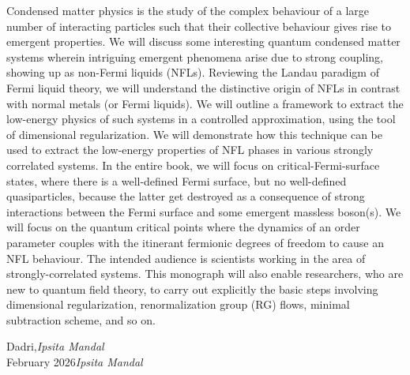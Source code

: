 %
%

\preface


Condensed matter physics is the study of the complex behaviour of a large number of interacting particles such that their collective behaviour gives rise to emergent properties. We will discuss some interesting quantum condensed matter systems wherein intriguing emergent phenomena arise due to strong coupling, showing up as non-Fermi liquids (NFLs). Reviewing the Landau paradigm of Fermi liquid theory, we will understand the distinctive origin of NFLs in contrast with  normal metals (or Fermi liquids). We will outline a framework to extract the low-energy physics of such systems in a controlled approximation, using the tool of dimensional regularization. We will demonstrate how this technique can be used to extract the low-energy properties of NFL phases in various strongly correlated systems. In the entire book, we will focus on critical-Fermi-surface states, where there is a well-defined Fermi surface, but no well-defined quasiparticles, because the latter get destroyed as a consequence of strong interactions between the Fermi surface and some emergent massless boson(s). We will focus on the quantum critical points where the dynamics of an order parameter couples with the itinerant fermionic degrees of freedom to cause an NFL behaviour. The intended audience is scientists working in the area of strongly-correlated systems. This monograph will also enable researchers, who are new to quantum field theory, to carry out explicitly the basic steps involving dimensional regularization, renormalization group (RG) flows, minimal subtraction scheme, and so on.

\vspace{\baselineskip}
\begin{flushright}\noindent
Dadri,\hfill {\it Ipsita  Mandal}\\
February 2026\hfill {\it Ipsita  Mandal}\\
\end{flushright}


